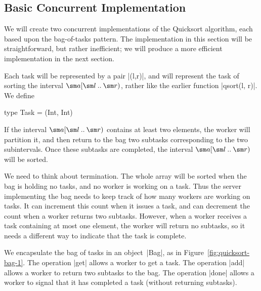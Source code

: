 
\subsection{Basic Concurrent Implementation}

We will create two concurrent implementations of the Quicksort algorithm, each
based upon the bag-of-tasks pattern.  The implementation in this section will
be straightforward, but rather inefficient; we will produce a more efficient
implementation in the next section.

Each task will be represented by a pair |(l,r)|, and will represent the task
of sorting the interval $\sm a\interval{\sm l}{\sm r}$, rather like the
earlier function |qsort(l, r)|.  We define
\begin{scala}
  type Task = (Int, Int)
\end{scala}
%
If the interval $\sm a\interval{\sm l}{\sm r}$ contains at least two elements,
the worker will partition it, and then return to the bag two subtasks
corresponding to the two subintervals.  Once these subtasks are completed, the
interval $\sm a\interval{\sm l}{\sm r}$ will be sorted.

We need to think about termination.  The whole array will be sorted when the
bag is holding no tasks, and no worker is working on a task.  Thus the server
implementing the bag needs to keep track of how many workers are working on
tasks.  It can increment this count when it issues a task, and can decrement
the count when a worker returns two subtasks.  However, when a worker receives
a task containing at most one element, the worker will return no subtasks, so
it needs a different way to indicate that the task is complete.

We encapsulate the bag of tasks in an object~|Bag|, as in
Figure~\ref{fig:quicksort-bag-1}.  The operation |get| allows a worker to get
a task.  The operation |add| allows a worker to return two subtasks to the
bag.  The operation |done| allows a worker to signal that it has completed a
task (without returning subtasks).


